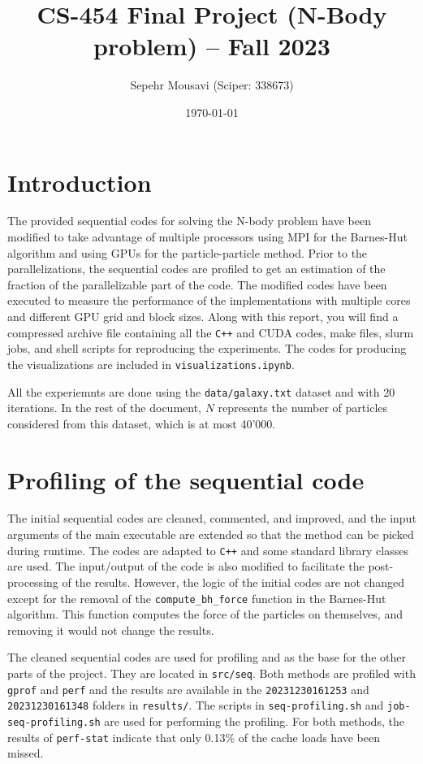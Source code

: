 \documentclass[10pt,journal,compsocconf]{IEEEtran}
\title{CS-454 Final Project (N-Body problem) -- Fall 2023}
\author{Sepehr Mousavi (Sciper: 338673)}
\date{\today}
\newcommand{\code}[1]{{\small \texttt{#1}}}
\begin{document}
\maketitle

\section{Introduction}

The provided sequential codes for solving the N-body problem have been modified to take advantage of multiple processors using MPI for the Barnes-Hut algorithm and using GPUs for the particle-particle method. Prior to the parallelizations, the sequential codes are profiled to get an estimation of the fraction of the parallelizable part of the code. The modified codes have been executed to measure the performance of the implementations with multiple cores and different GPU grid and block sizes. Along with this report, you will find a compressed archive file containing all the \code{C++} and CUDA codes, make files, slurm jobs, and shell scripts for reproducing the experiments. The codes for producing the visualizations are included in \code{visualizations.ipynb}.

All the experiemnts are done using the \code{data/galaxy.txt} dataset and with 20 iterations. In the rest of the document, $N$ represents the number of particles considered from this dataset, which is at most 40'000.

\section{Profiling of the sequential code}

The initial sequential codes are cleaned, commented, and improved, and the input arguments of the main executable are extended so that the method can be picked during runtime. The codes are adapted to \code{C++} and some standard library classes are used. The input/output of the code is also modified to facilitate the post-processing of the results. However, the logic of the initial codes are not changed except for the removal of the \code{compute\_bh\_force} function in the Barnes-Hut algorithm. This function computes the force of the particles on themselves, and removing it would not change the results.

The cleaned sequential codes are used for profiling and as the base for the other parts of the project. They are located in \code{src/seq}. Both methods are profiled with \code{gprof} and \code{perf} and the results are available in the \code{20231230161253} and \code{20231230161348} folders in \code{results/}. The scripts in \code{seq-profiling.sh} and \code{job-seq-profiling.sh} are used for performing the profiling. For both methods, the results of \code{perf-stat} indicate that only 0.13\% of the cache loads have been missed.
\end{document}
